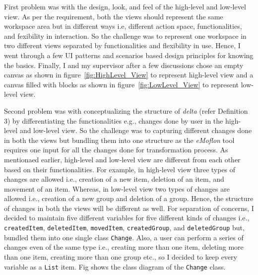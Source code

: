 First problem was with the design, look, and feel of the high-level and low-level view. As per the requirement, both the views should represent the same workspace area but in different ways i.e, different action space, functionalities, and fexibility in interaction. So the challenge was to represent one workspace in two different views separated by functionalities and flexibility in use. Hence, I went through a few UI patterns \cite{designinterfaces} and scenarios based design principles \cite{scenariobasedui} for knowing the basics. Finally, I and my supervisor after a few discussions chose an empty canvas as shown in figure~\ref{fig:HighLevel_View} to represent high-level view and a canvas filled with blocks as shown in figure~\ref{fig:LowLevel_View} to represent low-level view.

Second problem was with conceptualizing the structure of \textit{delta} (refer Definition 3) by differentiating the functionalities e.g., changes done by user in the high-level and low-level view. So the challenge was to capturing different changes done in both the views but bundling them into one structure as the \textit{eMoflon} tool requires one input for all the changes done for transformation process. As mentionaed earlier, high-level and low-level view are different from each other based on their functionalities. For example, in high-level view three types of changes are allowed i.e., creation of a new item, deletion of an item, and movement of an item. Whereas, in low-level view two types of changes are allowed i.e., creation of a new group and deletion of a group. Hence, the structure of changes in both the views will be different as well. For separation of concerns, I decided to maintain five different variables for five different kinds of changes i.e., \texttt{createdItem}, \texttt{deletedItem}, \texttt{movedItem}, \texttt{createdGroup}, and \texttt{deletedGroup} but, bundled them into one single class \texttt{Change}. Also, a user can perform a series of changes even of the same type i.e., creating more than one item, deleting more than one item, creating more than one group etc., so I decided to keep every variable as a \texttt{List} item. Fig shows the class diagram of the \texttt{Change} class.











